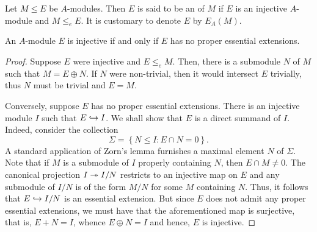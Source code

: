 \begin{definition}
    Let $M\le E$ be $A$-modules. Then $E$ is said to be an  of $M$ if $E$ is an injective $A$-module and $M\le_e E$. It is customary to denote $E$ by $E_A(M)$.
\end{definition}

\begin{proposition}
    An $A$-module $E$ is injective if and only if $E$ has no proper essential extensions.
\end{proposition}
\begin{proof}
    Suppose $E$ were injective and $E\le_e M$. Then, there is a submodule $N$ of $M$ such that $M = E\oplus N$. If $N$ were non-trivial, then it would intersect $E$ trivially, thus $N$ must be trivial and $E = M$.

    Conversely, suppose $E$ has no proper essential extensions. There is an injective module $I$ such that $E\hookrightarrow I$. We shall show that $E$ is a direct summand of $I$. Indeed, consider the collection 
    \begin{equation*}
        \Sigma = \left\{N\le I\colon E\cap N = 0\right\}.
    \end{equation*}
    A standard application of Zorn's lemma furnishes a maximal element $N$ of $\Sigma$. Note that if $M$ is a submodule of $I$ properly containing $N$, then $E\cap M\ne 0$. The canonical projection $I\twoheadrightarrow I/N$ restricts to an injective map on $E$ and any submodule of $I/N$ is of the form $M/N$ for some $M$ containing $N$. Thus, it follows that $E\hookrightarrow I/N$ is an essential extension. But since $E$ does not admit any proper essential extensions, we must have that the aforementioned map is surjective, that is, $E + N = I$, whence $E\oplus N = I$ and hence, $E$ is injective.
\end{proof}

